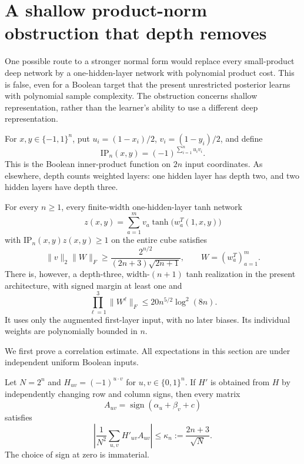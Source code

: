 \section{A shallow product-norm obstruction that depth removes}
\label{sec:shallow-product-separation}

One possible route to a stronger normal form would replace every
small-product deep network by a one-hidden-layer network with polynomial
product cost. This is false, even for a Boolean target that the present
unrestricted posterior learns with polynomial sample complexity.
The obstruction concerns shallow representation, rather than the
learner's ability to use a different deep representation.

For $x,y\in\{-1,1\}^n$, put $u_i=(1-x_i)/2$, $v_i=(1-y_i)/2$, and define
\[
 \mathrm{IP}_n(x,y)=(-1)^{\sum_{i=1}^n u_iv_i}.
\]
This is the Boolean inner-product function on $2n$ input coordinates.
As elsewhere, depth counts weighted layers: one hidden layer has depth
two, and two hidden layers have depth three.

\begin{theorem}
\label{thm:ip-shallow-product-separation}
For every $n\ge1$, every finite-width one-hidden-layer tanh network
\[
 z(x,y)=\sum_{a=1}^m v_a\tanh\bigl(w_a^T(1,x,y)\bigr)
\]
with $\mathrm{IP}_n(x,y)z(x,y)\ge1$ on the entire cube satisfies
\[
 \|v\|_2\|W\|_F
 \ge \frac{2^{n/2}}{(2n+3)\sqrt{2n+1}},
 \qquad W=(w_a^T)_{a=1}^m.
\]
There is, however, a depth-three, width-$(n+1)$ tanh realization in the
present architecture, with signed margin at least one and
\[
 \prod_{\ell=1}^3\|W^\ell\|_F
 \le20n^{5/2}\log^2(8n).
\]
It uses only the augmented first-layer input, with no later biases.
Its individual weights are polynomially bounded in $n$.
\end{theorem}

We first prove a correlation estimate. All expectations in this section
are under independent uniform Boolean inputs.

\begin{lemma}
\label{lem:ip-halfspace-correlation}
Let $N=2^n$ and $H_{uv}=(-1)^{u\cdot v}$ for
$u,v\in\{0,1\}^n$. If $H'$ is obtained from $H$ by independently
changing row and column signs, then every matrix
\[
 A_{uv}=\operatorname{sign}(\alpha_u+\beta_v+c)
\]
satisfies
\[
 \left|\frac1{N^2}\sum_{u,v}H'_{uv}A_{uv}\right|
 \le \kappa_n:=\frac{2n+3}{\sqrt N}.
\]
The choice of sign at zero is immaterial.
\end{lemma}

